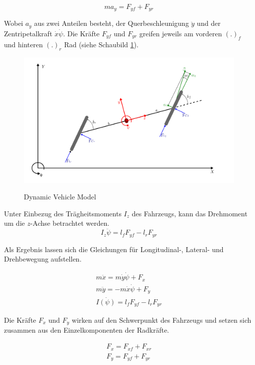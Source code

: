 \documentclass{like}
\begin{document}
\begin{equation}
ma_y = F_{yf} + F_{yr}
\end{equation}   


Wobei \(a_y\) aus zwei Anteilen besteht, der Querbeschleunigung \(\ddot{y}\) und der Zentripetalkraft \(\dot{x} \dot{\psi}\).  
Die Kräfte \(F_{yf}\) und \(F_{yr}\) greifen jeweils am vorderen \((.)_f\) und hinteren \((.)_r\) Rad (siehe Schaubild \ref{fig:dynModel}). 

\begin{figure}[hb!]
	\caption{Dynamic Vehicle Model}
	\includegraphics[width=350pt]{Abbildungen/dynModel.png}
	\label{fig:dynModel}
\end{figure}




Unter Einbezug des Trägheitsmoments \(I_z\) des Fahrzeugs, kann das Drehmoment um die \(z\)-Achse betrachtet werden.
\begin{equation}
I_z \ddot{\psi} = l_f F_{yf} - l_r F_{yr}
\end{equation}

Als Ergebnis lassen sich die Gleichungen für Longitudinal-, Lateral- und Drehbewegung aufstellen.

\begin{eqnarray}
	m \ddot{x} = m \dot{y} \dot{\psi} + F_x \\
	m \ddot{y} = - m \dot{x} \dot{\psi} + F_y \\
	I \ddot{(\psi)} = l_f F_{yf} - l_r F_{yr}
\end{eqnarray}

Die Kräfte \(F_{x}\) und \(F_{y}\) wirken auf den Schwerpunkt des Fahrzeugs und setzen sich zusammen aus den Einzelkomponenten der Radkräfte.

\begin{eqnarray}
F_x = F_{xf} + F_{xr} \\
F_y = F_{yf} + F_{yr}
\end{eqnarray}
\end{document}
